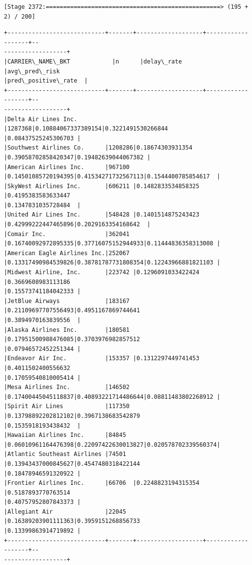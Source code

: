 \documentclass[11pt]{article}
\begin{document}
    \begin{Verbatim}[commandchars=\\\{\}]
[Stage 2372:==================================================> (195 + 2) / 200]
    \end{Verbatim}

    \begin{Verbatim}[commandchars=\\\{\}]
+----------------------------+-------+-------------------+-------------------+--
------------------+
|CARRIER\_NAME\_BKT            |n      |delay\_rate         |avg\_pred\_risk
|pred\_positive\_rate  |
+----------------------------+-------+-------------------+-------------------+--
------------------+
|Delta Air Lines Inc.        |1287368|0.10884067337389154|0.3221491530266844
|0.08437525245306703 |
|Southwest Airlines Co.      |1208286|0.18674303931354
|0.39058702858420347|0.19482639044067382 |
|American Airlines Inc.      |967100
|0.14501085720194395|0.41534271732567113|0.1544400785854617  |
|SkyWest Airlines Inc.       |606211 |0.1482833534858325 |0.4195383583633447
|0.1347831035728484  |
|United Air Lines Inc.       |548428 |0.1401514875243423
|0.42999222447465896|0.2029163354168642  |
|Comair Inc.                 |362041
|0.16740092972895335|0.37716075152944933|0.11444836358313008 |
|American Eagle Airlines Inc.|252067
|0.13317490984539826|0.38781787731808354|0.12243966881821103 |
|Midwest Airline, Inc.       |223742 |0.1296091033422424 |0.3669608983113186
|0.15573741184042333 |
|JetBlue Airways             |183167 |0.21109697707556493|0.4951167869744641
|0.3894970163839556  |
|Alaska Airlines Inc.        |180581 |0.17951500988476085|0.3703976982857512
|0.07946572452251344 |
|Endeavor Air Inc.           |153357 |0.1312297449741453 |0.4011502400556632
|0.17059540810005414 |
|Mesa Airlines Inc.          |146502
|0.17400445045118837|0.40893221714486644|0.08811483802268912 |
|Spirit Air Lines            |117350 |0.13798892202812102|0.3967138683542879
|0.1535918193438432  |
|Hawaiian Airlines Inc.      |84845
|0.06010961164476398|0.22097422630013827|0.020578702339560374|
|Atlantic Southeast Airlines |74501  |0.13943437000845627|0.4547480318422144
|0.18478946591320922 |
|Frontier Airlines Inc.      |66706  |0.2248823194315354 |0.5187893770763514
|0.40757952807843373 |
|Allegiant Air               |22045  |0.16389203901111363|0.3959151268856733
|0.13399863914719892 |
+----------------------------+-------+-------------------+-------------------+--
------------------+

    \end{Verbatim}
\end{document}
